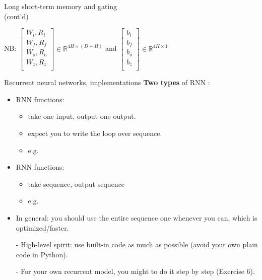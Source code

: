 \begin{frame}{Long short-term memory and gating\\ (cont'd)}
\begin{itemize}
\end{itemize}
\vsp
NB: $      \begin{bmatrix}
           W_{i}, R_{i} \\
           W_{f}, R_{f} \\
           W_{o}, R_{o} \\
           W_{z}, R_{z} \\
         \end{bmatrix} \in \mathbb{R}^{4H \times (D+H)}$ and  
$\begin{bmatrix}
           b_i \\
           b_f \\
           b_o \\
           b_z \\
         \end{bmatrix} \in \mathbb{R}^{4H \times 1}$
\end{frame}



\begin{frame}{Recurrent neural networks, implementations}
\textbf{Two types} of RNN :
\begin{itemize}
\item {} RNN functions:
\begin{itemize}
\item take one input, output one output.
\item expect you to write the loop over sequence. 
\item e.g. 
\end{itemize}
\item {} RNN functions:
\begin{itemize}
\item take sequence, output sequence
\item e.g. 
\end{itemize}
\item In general: you should use the entire sequence one whenever you can,
which is optimized/faster.\\
\item[-] High-level spirit: use built-in code as much as possible (avoid your own plain code in Python).\\
\item[-] For your own recurrent model, you might to
do it step by step (Exercise 6).\\
\end{itemize}
\end{frame}

